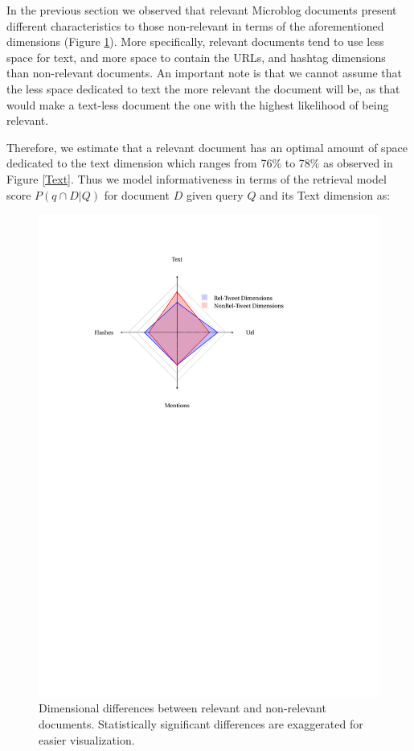 In the previous section we observed that relevant Microblog documents present different characteristics to those non-relevant in terms of the aforementioned dimensions (Figure \ref{dimensionaltweet}). More specifically, relevant documents tend to use less space for text, and more space to contain the URLs, and hashtag dimensions than non-relevant documents. An important note is that we cannot assume that the less space dedicated to text the more relevant the document will be, as that would make a text-less document the one with the highest likelihood of being relevant. 







Therefore, we estimate that a relevant document has an optimal amount of space dedicated to the text dimension which ranges from 76\% to 78\% as observed in Figure \ref{Text}. Thus we model informativeness in terms of the retrieval model score \(P(q \cap D|Q)\) for document \(D\) given query \(Q\) and its Text dimension as: 



\begin{figure}[]

	\centering

	\includegraphics[trim = 30mm 175mm 58mm 22mm, clip, width=11.5cm]{kiviat.pdf}

	\caption{Dimensional differences between relevant and non-relevant documents. Statistically significant differences are exaggerated for easier visualization.}

	\label{dimensionaltweet}

	

\end{figure}



